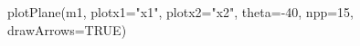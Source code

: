 \begin{Schunk}
\begin{Sinput}
 plotPlane(m1, plotx1="x1", plotx2="x2", theta=-40, npp=15, drawArrows=TRUE)
\end{Sinput}
\end{Schunk}
